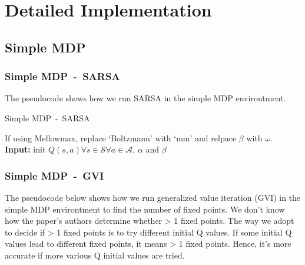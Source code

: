 \section{Detailed Implementation}\label{section:implementation}


\subsection{Simple MDP}

\subsubsection{Simple MDP\ -\ SARSA}

The pseudocode shows how we run SARSA in the simple MDP environtment.

\begin{algorithm}
    \caption{Simple MDP\ -\ SARSA}\label{alg:SimpleMDP-SARSA}
    If using Mellowmax, replace `Boltzmann' with `mm' and relpace $\beta$ with $\omega$.\\
    \textbf{Input:} init $Q(s,a) \forall s\in \mathcal{S} \forall a\in \mathcal{A}$, $\alpha$ and $\beta$
    \begin{algorithmic}[1]
            \Repeat{}
        \EndFor{}
    \end{algorithmic}
\end{algorithm}

\subsubsection{Simple MDP\ -\ GVI}\label{sec:simpleMDP_GVI}

The pseudocode below shows how we run generalized value iteration (GVI) in the simple MDP environtment to find the number of fixed points.
We don't know how the paper's authors determine whether > 1 fixed points.
The way we adopt to decide if > 1 fixed points is to try different initial Q values.
If some initial Q values lead to different fixed points, it means > 1 fixed points.
Hence, it's more accurate if more various Q initial values are tried.

